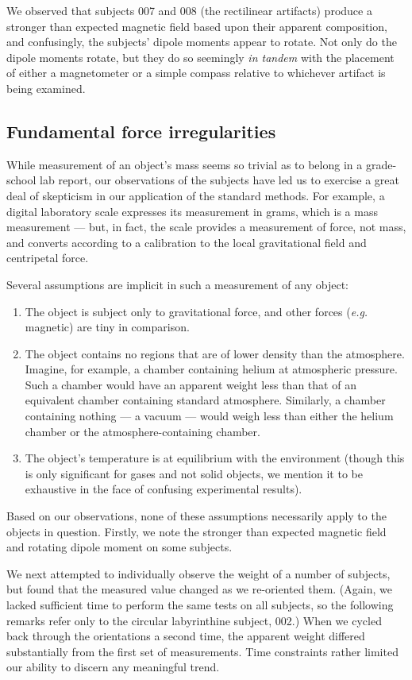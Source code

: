 \documentclass[10pt]{article}
\theoremstyle{definition}
\begin{document}
We observed that subjects 007 and 008 (the rectilinear artifacts) produce a stronger than expected magnetic field based upon their apparent composition, and confusingly, the subjects' dipole moments appear to rotate.
Not only do the dipole moments rotate, but they do so seemingly \textit{in tandem} with the placement of either a magnetometer or a simple compass relative to whichever artifact is being examined.

\subsection{Fundamental force irregularities}
While measurement of an object's mass seems so trivial as to belong in a grade-school lab report, our observations of the subjects have led us to exercise a great deal of skepticism in our application of the standard methods.
For example, a digital laboratory scale expresses its measurement in grams, which is a mass measurement --- but, in fact, the scale provides a measurement of force, not mass, and converts according to a calibration to the local gravitational field and centripetal force.

Several assumptions are implicit in such a measurement of any object:
\begin{enumerate}
\item The object is subject only to gravitational force, and other forces (\textit{e.g.} magnetic) are tiny in comparison.
\item The object contains no regions that are of lower density than the atmosphere. Imagine, for example, a chamber containing helium at atmospheric pressure. Such a chamber would have an apparent weight less than that of an equivalent chamber containing standard atmosphere. Similarly, a chamber containing nothing --- a vacuum --- would weigh less than either the helium chamber or the atmosphere-containing chamber.
\item The object's temperature is at equilibrium with the environment (though this is only significant for gases and not solid objects, we mention it to be exhaustive in the face of confusing experimental results).
\end{enumerate}

Based on our observations, none of these assumptions necessarily apply to the objects in question.
Firstly, we note the stronger than expected magnetic field and rotating dipole moment on some subjects.

We next attempted to individually observe the weight of a number of subjects, but found that the measured value changed as we re-oriented them.
(Again, we lacked sufficient time to perform the same tests on all subjects, so the following remarks refer only to the circular labyrinthine subject, 002.)
When we cycled back through the orientations a second time, the apparent weight differed substantially from the first set of measurements.
Time constraints rather limited our ability to discern any meaningful trend.
\end{document}
